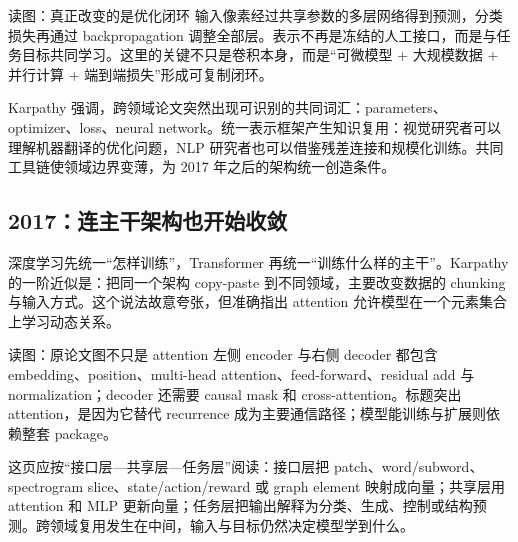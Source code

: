 
\begin{knowledgebox}{读图：真正改变的是优化闭环}
输入像素经过共享参数的多层网络得到预测，分类损失再通过 backpropagation 调整全部层。表示不再是冻结的人工接口，而是与任务目标共同学习。这里的关键不只是卷积本身，而是“可微模型 + 大规模数据 + 并行计算 + 端到端损失”形成可复制闭环。
\end{knowledgebox}


Karpathy 强调，跨领域论文突然出现可识别的共同词汇：parameters、optimizer、loss、neural network。统一表示框架产生知识复用：视觉研究者可以理解机器翻译的优化问题，NLP 研究者也可以借鉴残差连接和规模化训练。共同工具链使领域边界变薄，为 2017 年之后的架构统一创造条件。

\subsection{2017：连主干架构也开始收敛}

深度学习先统一“怎样训练”，Transformer 再统一“训练什么样的主干”。Karpathy 的一阶近似是：把同一个架构 copy-paste 到不同领域，主要改变数据的 chunking 与输入方式。这个说法故意夸张，但准确指出 attention 允许模型在一个元素集合上学习动态关系。


\begin{knowledgebox}{读图：原论文图不只是 attention}
左侧 encoder 与右侧 decoder 都包含 embedding、position、multi-head attention、feed-forward、residual add 与 normalization；decoder 还需要 causal mask 和 cross-attention。标题突出 attention，是因为它替代 recurrence 成为主要通信路径；模型能训练与扩展则依赖整套 package。
\end{knowledgebox}


这页应按“接口层—共享层—任务层”阅读：接口层把 patch、word/subword、spectrogram slice、state/action/reward 或 graph element 映射成向量；共享层用 attention 和 MLP 更新向量；任务层把输出解释为分类、生成、控制或结构预测。跨领域复用发生在中间，输入与目标仍然决定模型学到什么。

